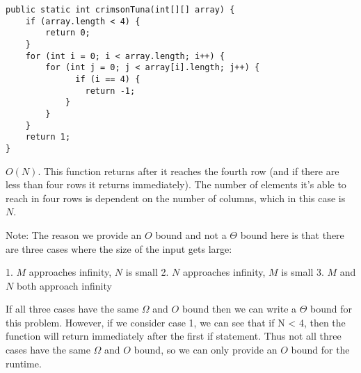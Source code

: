 \begin{blocksection}
\question

\begin{lstlisting}
public static int crimsonTuna(int[][] array) {
    if (array.length < 4) {
        return 0;
    }
    for (int i = 0; i < array.length; i++) {
        for (int j = 0; j < array[i].length; j++) {
              if (i == 4) {
                return -1;
            }
        }
    }
    return 1;
}
\end{lstlisting}

\begin{solution}
$O(N)$. This function returns after it reaches the fourth row (and if there are
less than four rows it returns immediately). The number of elements it's able
to reach in four rows is dependent on the number of columns, which in this case
is $N$.

Note: The reason we provide an $O$ bound and not a $\Theta$ bound here is that
there are three cases where the size of the input gets large:

1. $M$ approaches infinity, $N$ is small
2. $N$ approaches infinity, $M$ is small
3. $M$ and $N$ both approach infinity

If all three cases have the same $\Omega$ and $O$ bound then we can write a
$\Theta$ bound for this problem. However, if we consider case 1, we can see
that if N < 4, then the function will return immediately after the first
if statement. Thus not all three cases have the same  $\Omega$ and $O$ bound,
so we can only provide an $O$ bound for the runtime.
\end{solution}
\end{blocksection}
